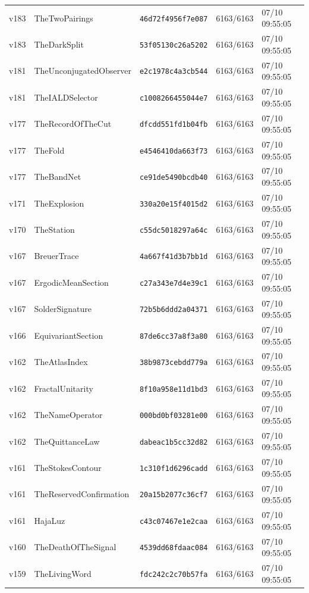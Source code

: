 \documentclass[11pt]{article}
\theoremstyle{definition}\newtheorem{deriv}{Derivação}
\begin{document}
{\begin{longtable}{@{}lllll@{}}
v183 & TheTwoPairings & \texttt{46d72f4956f7e087} & 6163/6163 & 07/10 09:55:05 \\
v183 & TheDarkSplit & \texttt{53f05130c26a5202} & 6163/6163 & 07/10 09:55:05 \\
v181 & TheUnconjugatedObserver & \texttt{e2c1978c4a3cb544} & 6163/6163 & 07/10 09:55:05 \\
v181 & TheIALDSelector & \texttt{c1008266455044e7} & 6163/6163 & 07/10 09:55:05 \\
v177 & TheRecordOfTheCut & \texttt{dfcdd551fd1b04fb} & 6163/6163 & 07/10 09:55:05 \\
v177 & TheFold & \texttt{e4546410da663f73} & 6163/6163 & 07/10 09:55:05 \\
v177 & TheBandNet & \texttt{ce91de5490bcdb40} & 6163/6163 & 07/10 09:55:05 \\
v171 & TheExplosion & \texttt{330a20e15f4015d2} & 6163/6163 & 07/10 09:55:05 \\
v170 & TheStation & \texttt{c55dc5018297a64c} & 6163/6163 & 07/10 09:55:05 \\
v167 & BreuerTrace & \texttt{4a667f41d3b7bb1d} & 6163/6163 & 07/10 09:55:05 \\
v167 & ErgodicMeanSection & \texttt{c27a343e7d4e39c1} & 6163/6163 & 07/10 09:55:05 \\
v167 & SolderSignature & \texttt{72b5b6ddd2a04371} & 6163/6163 & 07/10 09:55:05 \\
v166 & EquivariantSection & \texttt{87de6cc37a8f3a80} & 6163/6163 & 07/10 09:55:05 \\
v162 & TheAtlasIndex & \texttt{38b9873cebdd779a} & 6163/6163 & 07/10 09:55:05 \\
v162 & FractalUnitarity & \texttt{8f10a958e11d1bd3} & 6163/6163 & 07/10 09:55:05 \\
v162 & TheNameOperator & \texttt{000bd0bf03281e00} & 6163/6163 & 07/10 09:55:05 \\
v162 & TheQuittanceLaw & \texttt{dabeac1b5cc32d82} & 6163/6163 & 07/10 09:55:05 \\
v161 & TheStokesContour & \texttt{1c310f1d6296cadd} & 6163/6163 & 07/10 09:55:05 \\
v161 & TheReservedConfirmation & \texttt{20a15b2077c36cf7} & 6163/6163 & 07/10 09:55:05 \\
v161 & HajaLuz & \texttt{c43c07467e1e2caa} & 6163/6163 & 07/10 09:55:05 \\
v160 & TheDeathOfTheSignal & \texttt{4539dd68fdaac084} & 6163/6163 & 07/10 09:55:05 \\
v159 & TheLivingWord & \texttt{fdc242c2c70b57fa} & 6163/6163 & 07/10 09:55:05 \\

\end{longtable}}
\end{document}

